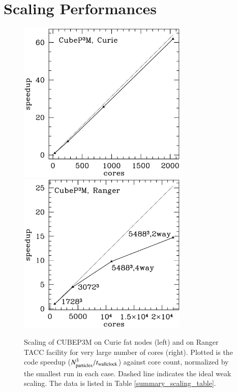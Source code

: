 \section{Scaling Performances}
\label{sec:scaling}

\begin{figure}%
  \begin{center}
    \includegraphics[width=3.2in]{graphs/scaling_cubep3m_curie.eps}
    \includegraphics[width=3.2in]{graphs/scaling_cubep3m_new.eps}
  \caption{Scaling of {\small CUBEP3M} on Curie fat nodes (left) and 
    on Ranger TACC facility for very large number of cores (right). Plotted is the code speedup 
    ($N_{\rm particles}^3/t_{\rm wallclock}$) against core count, normalized by the smallest run 
    in each case. Dashed line indicates the ideal weak 
    scaling. The data is listed in Table \ref{summary_scaling_table}.
    \label{scaling}
}
\end{center}
\end{figure}

